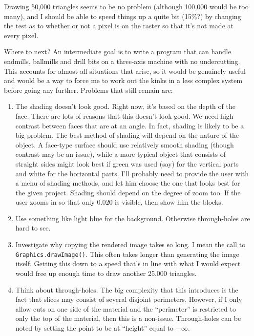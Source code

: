 \documentclass[titlepage,oneside,10pt]{article}
\begin{document}
Drawing 50,000 triangles seems to be no problem (although 100,000
would be too many), and I should be able to speed things up a
quite bit (15\%?) by changing the test as to whether or not a pixel is
on the raster so that it's not made at every pixel.

Where to next? An intermediate goal is to write a program that can
handle endmills, ballmills and drill bits on a three-axis machine with
no undercutting. This accounts for almost all situations that arise,
so it would be genuinely useful and would be a way to force me to work
out the kinks in a less complex system before going any
further. Problems that still remain are:

\begin{enumerate}
\setlength{\itemsep}{0mm}
\item The shading doesn't look good. Right now, it's based on the
  depth of the face. There are lots of reasons that this doesn't look
  good. We need high contrast between faces that are at an angle. In
  fact, shading is likely to be a big problem. The best method of
  shading will depend on the nature of the object. A face-type surface
  should use relatively smooth shading (though contrast may be an
  issue), while a more typical object that consists of straight sides
  might look best if green was used (say) for the vertical parts and
  white for the horizontal parts. I'll probably need to provide the
  user with a menu of shading methods, and let him choose the one that
  looks best for the given project. Shading should depend on the
  degree of zoom too. If the user zooms in so that only $0.020$ is
  visible, then show him the blocks.
\item Use something like light blue for the background. Otherwise
  through-holes are hard to see.
\item Investigate why copying the rendered image takes so long. I mean
  the call to {\tt Graphics.drawImage()}. This often takes longer than
  generating the image itself. Getting this down to a speed that's in
  line with what I would expect would free up enough time to draw
  another 25,000 triangles.
\item Think about through-holes. The big complexity that this
  introduces is the fact that slices may consist of several disjoint
  perimeters. However, if I only allow cuts on one side of the
  material and the ``perimeter'' is restricted to only the top of the
  material, then this is a non-issue. Through-holes can be noted by
  setting the point to be at ``height'' equal to $-\infty$.

\end{enumerate}
\end{document}
